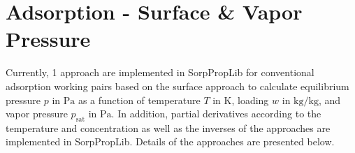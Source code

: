 %
\section{Adsorption - Surface \& Vapor Pressure}
\label{cha:ads:surp}
%
Currently, 1 approach are implemented in SorpPropLib for conventional adsorption working pairs based on the surface approach to calculate equilibrium pressure $p$ in $\si{\pascal}$ as a function of temperature $T$ in $\si{\kelvin}$, loading $w$ in $\si{\kilogram\per\kilogram}$, and vapor pressure $p_\mathrm{sat}$ in $\si{\pascal}$. In addition, partial derivatives according to the temperature and concentration as well as the inverses of the approaches are implemented in SorpPropLib. Details of the approaches are presented below.
